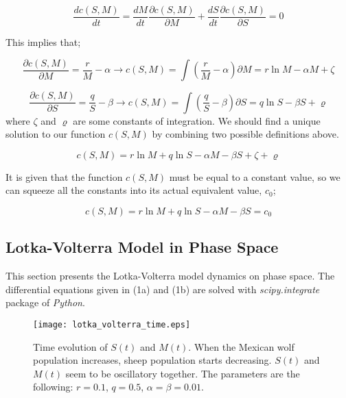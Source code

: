 \documentclass[12pt]{article}
\begin{document}
\begin{equation}
\frac{d c(S,M)}{dt} = \frac{dM}{dt} \frac{\partial c(S,M)}{\partial M} + \frac{dS}{dt} \frac{\partial c(S,M)}{\partial S} = 0
\end{equation}

This implies that;

\begin{equation*}
\frac{\partial c(S,M)}{\partial M} = \frac{r}{M} - \alpha \longrightarrow c(S,M) = \int (\frac{r}{M} - \alpha) \partial M = r \ln M - \alpha M + \zeta
\end{equation*}


\begin{equation*}
\frac{\partial c(S,M)}{\partial S} = \frac{q}{S} - \beta \longrightarrow c(S,M) = \int (\frac{q}{S} - \beta) \partial S = q \ln S - \beta S + \varrho
\end{equation*}
where $\zeta$ and $\varrho$ are some constants of integration. We should find a unique solution to our function $c(S,M)$ by combining two possible definitions above.

\begin{equation}
c(S,M) = r \ln M + q \ln S -\alpha M - \beta S  + \zeta +\varrho 
\end{equation}

It is given that the function $c(S,M)$ must be equal to a constant value, so we can squeeze all the constants into its actual equivalent value, $c_0$;

\begin{equation}
c(S,M) = r \ln M + q \ln S -\alpha M - \beta S   = c_0
\end{equation}


\subsection{Lotka-Volterra Model in Phase Space}

This section presents the Lotka-Volterra model dynamics on phase space. The differential equations given in (1a) and (1b) are solved with \textit{scipy.integrate} package of \textit{Python}. 

\begin{figure}[h!]
	\centering
	\texttt{[image: lotka\_volterra\_time.eps]}
		\caption{Time evolution of $S(t)$ and $M(t)$. When the Mexican wolf population increases, sheep population starts decreasing. $S(t)$ and $M(t)$ seem to be oscillatory together. The parameters are the following: $r=0.1$, $q=0.5$, $\alpha=\beta=0.01$.}
\end{figure}
\end{document}
